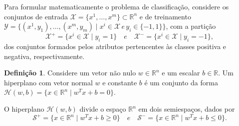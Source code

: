 \documentclass[12pt,a4paper]{scrartcl}
\def\Xset{\mathcal{X}}
\def\Yset{\mathcal{Y}}
\def\Hset{\mathcal{H}}
\def\RR{\mathds{R}}
\theoremstyle{definition}%
\newtheorem{defi}{Definição}
\begin{document}
Para formular matematicamente o problema de classificação, considere os conjuntos de entrada $\Xset =\{x^1, \ldots , x^m \} \subset \RR^n$ e de treinamento $\Yset=\{(x^1, y_1), \ldots , (x^m, y_m)\mid x^i \in \Xset \, e \, y_i \in \{-1,1\}\}$, com a partição 
\[ \label{conj1}
\Xset ^{+} =\{x^i \in \Xset\mid y_i=1\} \quad e \quad \Xset^{-}=\{x^i \in \Xset\mid y_i=-1\},
\]
dos conjuntos formados pelos atributos pertencentes às classes positiva e negativa, respectivamente.

\begin{defi} Considere um vetor não nulo $w\in \RR^n$ e um escalar $b\in \RR$. Um hiperplano com vetor normal $w$ e constante $b$ é um conjunto da forma $\Hset(w,b)=\{x\in \RR^n \mid w^{T}x+b=0\}$.
\end{defi}

O hiperplano $\Hset(w,b)$ divide o espaço $\RR^n$ em dois semiespaços, dados por
\[ \label{conj2}
\mathcal{S}^{+}=\{x\in \RR^n \mid w^{T}x+b\geq 0\} \quad e \quad \mathcal{S}^{-}=\{x\in \RR^n \mid w^{T}x+b\leq 0\}.
\]
\end{document}
